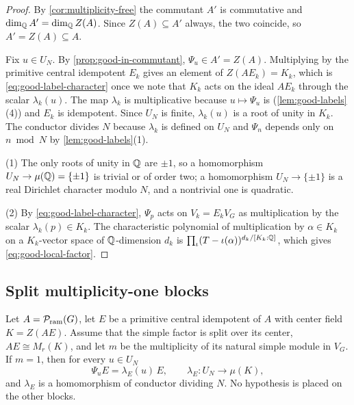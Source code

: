 \begin{proof}
By \cref{cor:multiplicity-free} the commutant \(A'\) is commutative and
\(\dim_\mathbb Q A'=\dim_\mathbb Q Z(A)\).  Since \(Z(A)\subseteq A'\) always, the two
coincide, so \(A'=Z(A)\subseteq A\).

Fix \(u\in U_N\).  By \cref{prop:good-in-commutant}, \(\Psi_u\in A'=Z(A)\).
Multiplying by the primitive central idempotent \(E_k\) gives an element of
\(Z(AE_k)=K_k\), which is \eqref{eq:good-label-character} once we note that
\(K_k\) acts on the ideal \(AE_k\) through the scalar \(\lambda_k(u)\).  The
map \(\lambda_k\) is multiplicative because \(u\mapsto\Psi_u\) is
(\cref{lem:good-labels}(4)) and \(E_k\) is idempotent.  Since \(U_N\) is
finite, \(\lambda_k(u)\) is a root of unity in \(K_k\).  The conductor
divides \(N\) because \(\lambda_k\) is defined on \(U_N\) and
\(\Psi_n\) depends only on \(n\bmod N\) by \cref{lem:good-labels}(1).

(1)  The only roots of unity in \(\mathbb Q\) are \(\pm1\), so a homomorphism
\(U_N\to\mu(\mathbb Q)=\{\pm1\}\) is trivial or of order two; a homomorphism
\(U_N\to\{\pm1\}\) is a real Dirichlet character modulo \(N\), and
a nontrivial one is quadratic.

(2)  By \eqref{eq:good-label-character}, \(\Psi_p\) acts on
\(V_k=E_kV_G\) as multiplication by the scalar \(\lambda_k(p)\in K_k\).  The
characteristic polynomial of multiplication by \(\alpha\in K_k\) on a
\(K_k\)-vector space of \(\mathbb Q\)-dimension \(d_k\) is
\(\prod_\iota(T-\iota(\alpha))^{d_k/[K_k:\mathbb Q]}\), which gives
\eqref{eq:good-local-factor}.
\end{proof}

\subsection{Split multiplicity-one blocks}

\begin{theorem}
\label{thm:block-local-character}
Let \(A=\mathcal P_{\mathrm{ram}}(G)\), let \(E\) be a primitive central idempotent of \(A\) with
center field \(K=Z(AE)\).  Assume that the simple factor is split over its
center, \(AE\cong M_r(K)\), and let \(m\) be the multiplicity of its natural
simple module in \(V_G\).  If \(m=1\), then for every \(u\in U_N\)
\begin{equation}
 \Psi_uE=\lambda_E(u)\,E,
 \qquad
 \lambda_E:U_N\longrightarrow\mu(K),
 \label{eq:block-local-character}
\end{equation}
and \(\lambda_E\) is a homomorphism of conductor dividing \(N\).  No
hypothesis is placed on the other blocks.
\end{theorem}

